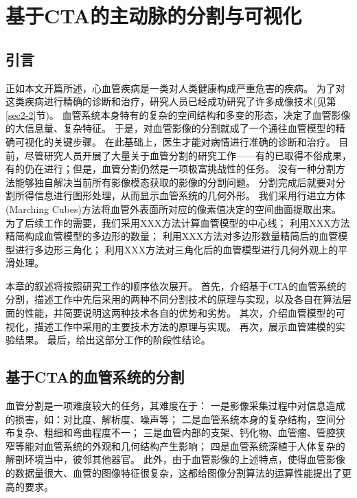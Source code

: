 \chapter{基于CTA的主动脉的分割与可视化}
\label{chap3} \fontsize{12pt}{12pt}\selectfont

\section{引言}

正如本文开篇所述，心血管疾病是一类对人类健康构成严重危害的疾病。
为了对这类疾病进行精确的诊断和治疗，研究人员已经成功研究了许多成像技术(见第\ref{sec2-2}节)。
血管系统本身特有的复杂的空间结构和多变的形态，决定了血管影像的大信息量、复杂特征。
于是，对血管影像的分割就成了一个通往血管模型的精确可视化的关键步骤。
在此基础上，医生才能对病情进行准确的诊断和治疗。
目前，尽管研究人员开展了大量关于血管分割的研究工作——有的已取得不俗成果，有的仍在进行；但是，血管分割仍然是一项极富挑战性的任务\cite{Lesage2009Review}。
没有一种分割方法能够独自解决当前所有影像模态获取的影像的分割问题。
分割完成后就要对分割所得信息进行图形处理，从而显示血管系统的几何外形。
我们采用行进立方体(Marching Cubes)方法\cite{Lorensen1987MC}将血管外表面所对应的像素值决定的空间曲面提取出来。
为了后续工作的需要，我们采用XXX方法计算血管模型的中心线；
利用XXX方法精简构成血管模型的多边形的数量；
利用XXX方法对多边形数量精简后的血管模型进行多边形三角化；
利用XXX方法对三角化后的血管模型进行几何外观上的平滑处理。

本章的叙述将按照研究工作的顺序依次展开。
首先，介绍基于CTA的血管系统的分割，描述工作中先后采用的两种不同分割技术的原理与实现，以及各自在算法层面的性能，并简要说明这两种技术各自的优势和劣势。
其次，介绍血管模型的可视化，描述工作中采用的主要技术方法的原理与实现。
再次，展示血管建模的实验结果。
最后，给出这部分工作的阶段性结论。

\section{基于CTA的血管系统的分割}

血管分割是一项难度较大的任务，其难度在于\cite{Lesage2009Review}：
一是影像采集过程中对信息造成的损害，如：对比度、解析度、噪声等；
二是血管系统本身的复杂结构，空间分布复杂、粗细和弯曲程度不一；
三是血管内部的支架、钙化物、血管瘤、管腔狭窄等能对血管系统的外观和几何结构产生影响；
四是血管系统深植于人体复杂的解剖环境当中，彼邻其他器官。
此外，由于血管影像的上述特点，使得血管影像的数据量很大、血管的图像特征很复杂，这都给图像分割算法的运算性能提出了更高的要求。

